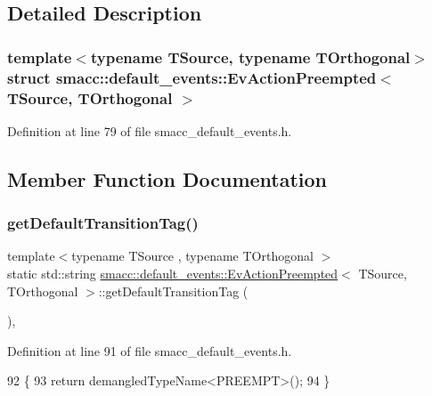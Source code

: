 \subsection{Detailed Description}
\subsubsection*{template$<$typename T\+Source, typename T\+Orthogonal$>$\newline
struct smacc\+::default\+\_\+events\+::\+Ev\+Action\+Preempted$<$ T\+Source, T\+Orthogonal $>$}



Definition at line 79 of file smacc\+\_\+default\+\_\+events.\+h.



\subsection{Member Function Documentation}
\mbox{\label{structsmacc_1_1default__events_1_1EvActionPreempted_aaa13306be922de1d5602899b47bf71be}} 
\subsubsection{\texorpdfstring{get\+Default\+Transition\+Tag()}{getDefaultTransitionTag()}}
{\footnotesize\ttfamily template$<$typename T\+Source , typename T\+Orthogonal $>$ \\
static std\+::string \hyperlink{structsmacc_1_1default__events_1_1EvActionPreempted}{smacc\+::default\+\_\+events\+::\+Ev\+Action\+Preempted}$<$ T\+Source, T\+Orthogonal $>$\+::get\+Default\+Transition\+Tag (\begin{DoxyParamCaption}{ }\end{DoxyParamCaption})\hspace{0.3cm}{\ttfamily [inline]}, {\ttfamily [static]}}



Definition at line 91 of file smacc\+\_\+default\+\_\+events.\+h.


\begin{DoxyCode}
92   \{
93     \textcolor{keywordflow}{return} demangledTypeName<PREEMPT>();
94   \}
\end{DoxyCode}
\mbox{\label{structsmacc_1_1default__events_1_1EvActionPreempted_ab2c4d784d7e56d72b8b7daba356d2099}} 
